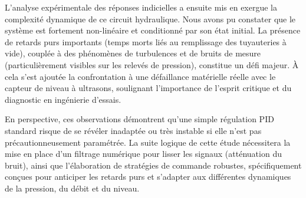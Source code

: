 \documentclass[12pt,a4paper]{article}
\begin{document}
L'analyse expérimentale des réponses indicielles a ensuite mis en exergue la complexité dynamique de ce circuit hydraulique. Nous avons pu constater que le système est fortement non-linéaire et conditionné par son état initial. La présence de retards purs importants (temps morts liés au remplissage des tuyauteries à vide), couplée à des phénomènes de turbulences et de bruits de mesure (particulièrement visibles sur les relevés de pression), constitue un défi majeur. À cela s'est ajoutée la confrontation à une défaillance matérielle réelle avec le capteur de niveau à ultrasons, soulignant l'importance de l'esprit critique et du diagnostic en ingénierie d'essais.

En perspective, ces observations démontrent qu'une simple régulation PID standard risque de se révéler inadaptée ou très instable si elle n'est pas précautionneusement paramétrée. La suite logique de cette étude nécessitera la mise en place d'un filtrage numérique pour lisser les signaux (atténuation du bruit), ainsi que l'élaboration de stratégies de commande robustes, spécifiquement conçues pour anticiper les retards purs et s'adapter aux différentes dynamiques de la pression, du débit et du niveau.
\end{document}
